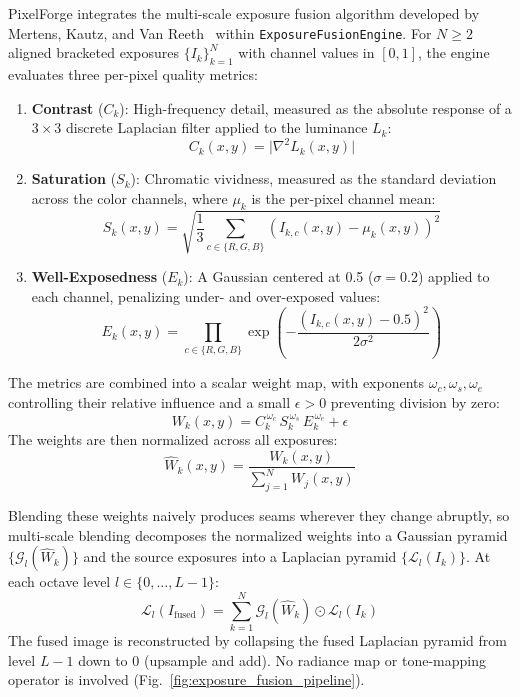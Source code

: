 \documentclass[10pt,journal,compsoc]{IEEEtran}
\begin{document}
PixelForge integrates the multi-scale exposure fusion algorithm developed by Mertens, Kautz, and Van Reeth~\cite{mertens2007} within \texttt{ExposureFusionEngine}. For $N \ge 2$ aligned bracketed exposures $\{I_k\}_{k=1}^N$ with channel values in $[0, 1]$, the engine evaluates three per-pixel quality metrics:
\begin{enumerate}
    \item \textbf{Contrast} ($C_k$): High-frequency detail, measured as the absolute response of a $3\times 3$ discrete Laplacian filter applied to the luminance $L_k$:
    \begin{equation}
    C_k(x, y) = \lvert \nabla^2 L_k(x, y) \rvert
    \end{equation}
    \item \textbf{Saturation} ($S_k$): Chromatic vividness, measured as the standard deviation across the color channels, where $\mu_k$ is the per-pixel channel mean:
    \begin{equation}
    S_k(x, y) = \sqrt{\frac{1}{3} \sum_{c \in \{R,G,B\}} \left(I_{k,c}(x, y) - \mu_k(x, y)\right)^2}
    \end{equation}
    \item \textbf{Well-Exposedness} ($E_k$): A Gaussian centered at 0.5 ($\sigma = 0.2$) applied to each channel, penalizing under- and over-exposed values:
    \begin{equation}
    E_k(x, y) = \prod_{c \in \{R,G,B\}} \exp\left(-\frac{\left(I_{k,c}(x, y) - 0.5\right)^2}{2\sigma^2}\right)
    \end{equation}
\end{enumerate}

The metrics are combined into a scalar weight map, with exponents $\omega_c, \omega_s, \omega_e$ controlling their relative influence and a small $\epsilon > 0$ preventing division by zero:
\begin{equation}
W_k(x, y) = C_k^{\,\omega_c}\, S_k^{\,\omega_s}\, E_k^{\,\omega_e} + \epsilon
\end{equation}
The weights are then normalized across all exposures:
\begin{equation}
\hat{W}_k(x, y) = \frac{W_k(x, y)}{\sum_{j=1}^N W_j(x, y)}
\end{equation}

Blending these weights naively produces seams wherever they change abruptly, so multi-scale blending decomposes the normalized weights into a Gaussian pyramid $\{\mathcal{G}_l(\hat{W}_k)\}$ and the source exposures into a Laplacian pyramid $\{\mathcal{L}_l(I_k)\}$. At each octave level $l \in \{0, \dots, L-1\}$:
\begin{equation}
\mathcal{L}_l(I_{\text{fused}}) = \sum_{k=1}^N \mathcal{G}_l(\hat{W}_k) \odot \mathcal{L}_l(I_k)
\end{equation}
The fused image is reconstructed by collapsing the fused Laplacian pyramid from level $L-1$ down to 0 (upsample and add). No radiance map or tone-mapping operator is involved (Fig.~\ref{fig:exposure_fusion_pipeline}).
\end{document}
